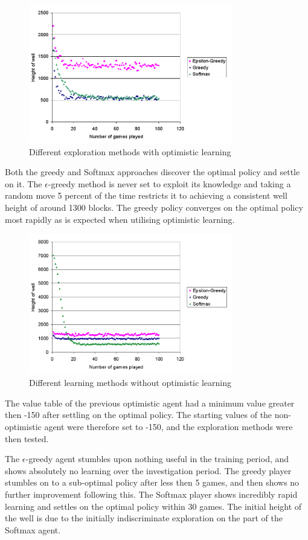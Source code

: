 \documentclass{rucsthesis}
\begin{document}
\begin{figure}[h]
\centering
\includegraphics[width=3.5in]{optomisticexp.png}
\caption{Different exploration methods with optimistic learning}
\label{fig:compexpopt}
\end{figure}

Both the greedy and Softmax approaches discover the optimal policy and settle on it. The $\epsilon$-greedy method is never set to exploit its knowledge and taking a random move 5 percent of the time restricts it to achieving a consistent well height of around 1300 blocks. The greedy policy converges on the optimal policy most rapidly as is expected when utilising optimistic learning.

\begin{figure}[h]
\centering
\includegraphics[width=3.5in]{nonoptomisticexp.png}
\caption{Different learning methods without optimistic learning}
\label{fig:compexp}
\end{figure}

The value table of the previous optimistic agent had a minimum value greater then -150 after settling on the optimal policy. The starting values of the non-optimistic agent were therefore set to -150, and the exploration methods were then tested.

The $\epsilon$-greedy agent stumbles upon nothing useful in the training period, and shows absolutely no learning over the investigation period. The greedy player stumbles on to a sub-optimal policy after less then 5 games, and then shows no further improvement following this. The Softmax player shows incredibly rapid learning and settles on the optimal policy within 30 games. The initial height of the well is due to the initially indiscriminate exploration on the part of the Softmax agent.
\end{document}
